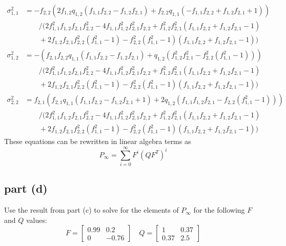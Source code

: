\documentclass[11pt]{article}
\begin{document}
\begin{align*}
	\sigma_{1,1}^2 &= -f_{2,2}(2f_{1,2}q_{1,2}(f_{1,1}f_{2,2} - f_{1,2}f_{2,1}) + f_{2,2}q_{1,1}(-f_{1,1}f_{2,2} + f_{1,2}f_{2,1} + 1)) \\
	&\qquad /(2f_{1,1}^2f_{1,2}f_{2,1}f_{2,2}^2 - 4f_{1,1}f_{1,2}^2f_{2,1}^2f_{2,2} + f_{1,2}^2f_{2,1}^2(f_{1,1}f_{2,2} + f_{1,2}f_{2,1} - 1) \\
	&\qquad + 2f_{1,2}f_{2,1}f_{2,2}^2(f_{1,1}^2 - 1) - f_{2,2}^2(f_{1,1}^2 - 1)(f_{1,1}f_{2,2} + f_{1,2}f_{2,1} - 1)) \\
	\sigma_{1,2}^2 &= -(f_{2,1}f_{2,2}q_{1,1}(f_{1,1}f_{2,2} - f_{1,2}f_{2,1}) + q_{1,2}(f_{1,2}^2f_{2,1}^2 - f_{2,2}^2(f_{1,1}^2 - 1))) \\
	&\qquad /(2f_{1,1}^2f_{1,2}f_{2,1}f_{2,2}^2 - 4f_{1,1}f_{1,2}^2f_{2,1}^2f_{2,2} + f_{1,2}^2f_{2,1}^2(f_{1,1}f_{2,2} + f_{1,2}f_{2,1} - 1) \\
	&\qquad+ 2f_{1,2}f_{2,1}f_{2,2}^2(f_{1,1}^2 - 1) - f_{2,2}^2(f_{1,1}^2 - 1)(f_{1,1}f_{2,2} + f_{1,2}f_{2,1} - 1)) \\
	\sigma_{2,2}^2 &= f_{2,1}(f_{2,1}q_{1,1}(f_{1,1}f_{2,2} - f_{1,2}f_{2,1} + 1) + 2q_{1,2}(f_{1,1}f_{1,2}f_{2,1} - f_{2,2}(f_{1,1}^2 - 1))) \\
	&\qquad /(2f_{1,1}^2f_{1,2}f_{2,1}f_{2,2}^2 - 4f_{1,1}f_{1,2}^2f_{2,1}^2f_{2,2} + f_{1,2}^2f_{2,1}^2(f_{1,1}f_{2,2} + f_{1,2}f_{2,1} - 1) \\
	&\qquad+ 2f_{1,2}f_{2,1}f_{2,2}^2(f_{1,1}^2 - 1) - f_{2,2}^2(f_{1,1}^2 - 1)(f_{1,1}f_{2,2} + f_{1,2}f_{2,1} - 1))
\end{align*}
These equations can be rewritten in linear algebra terms as
\begin{equation*}
	P_\infty = \sum_{i=0}^\infty F^i(QF^T)^i
\end{equation*}

\subsection*{part (d)}
Use the result from part (c) to solve for the elements of $P_\infty$ for the following $F$ and $Q$ values:
\begin{equation*}
	F=\begin{bmatrix} 0.99&0.2\\0&-0.76 \end{bmatrix}\quad Q=\begin{bmatrix} 1&0.37\\0.37&2.5 \end{bmatrix}
\end{equation*}
\end{document}

